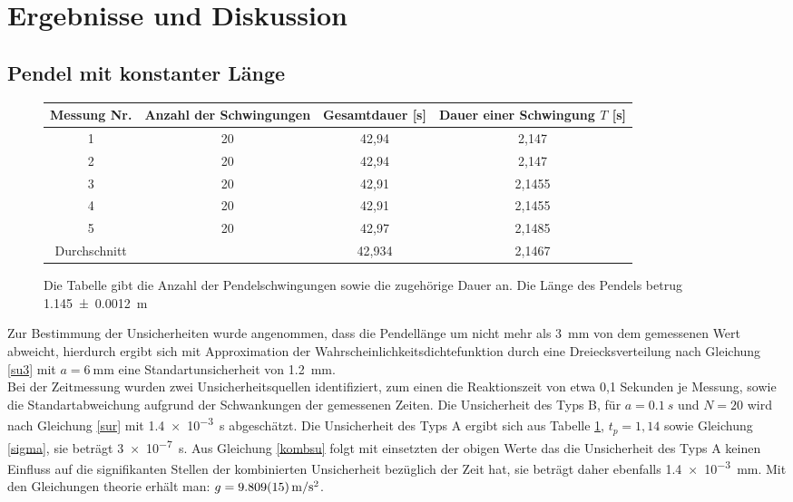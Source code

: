\newpage

\section{Ergebnisse und Diskussion}


\subsection{Pendel mit konstanter Länge}


\begin{figure}[h]


\begin{tabular}{|c||c|c|c|}
\hline
Messung Nr. & Anzahl der Schwingungen & Gesamtdauer [s] & Dauer einer Schwingung $T$ [s] \\ \hline \hline
1&	20&	42,94&	2,147	\\ \hline
2&	20&	42,94&	2,147	\\ \hline
3&	20&	42,91&	2,1455	\\ \hline
4&	20&	42,91&	2,1455	\\	\hline
5&	20&	42,97&	2,1485	\\ \hline
Durchschnitt&&42,934&2,1467	\\ \hline


	
\end{tabular}
\caption{Die Tabelle gibt die Anzahl der Pendelschwingungen sowie die zugehörige Dauer an. Die Länge des Pendels betrug \SI{1,145+-0,0012} {\m}}
\label{lkonst}

\end{figure}

Zur Bestimmung der Unsicherheiten wurde angenommen, dass die Pendellänge um nicht mehr als \SI{3}{\mm} von dem gemessenen Wert abweicht, hierdurch ergibt sich mit Approximation der Wahrscheinlichkeitsdichtefunktion durch eine Dreiecksverteilung nach Gleichung \ref{su3} mit $a=\SI{6}{\mm}$ eine Standartunsicherheit von \SI{1,2}{mm}. \\
Bei der Zeitmessung wurden zwei Unsicherheitsquellen identifiziert, zum einen die Reaktionszeit von etwa 0,1 Sekunden je Messung, sowie die Standartabweichung aufgrund der Schwankungen der gemessenen Zeiten. Die Unsicherheit des Typs B, für  $a=\SI{0,1}{s} $ und $N=20$ wird nach Gleichung \ref{sur} mit \SI{1,4e-3}{\s} abgeschätzt. Die Unsicherheit des Typs A ergibt sich aus Tabelle \ref{lkonst}, $t_p=1,14$ sowie Gleichung \ref{sigma}, sie beträgt \SI{3e-7}{s}. Aus Gleichung \ref{kombsu} folgt mit einsetzten der obigen Werte das die Unsicherheit des Typs A keinen Einfluss  auf die signifikanten Stellen der kombinierten Unsicherheit bezüglich der Zeit hat, sie beträgt daher ebenfalls \SI{1,4e-3}{mm}.
Mit den Gleichungen theorie erhält man: $g=\SI{9,809+-0,015}{m/s^2}$.





